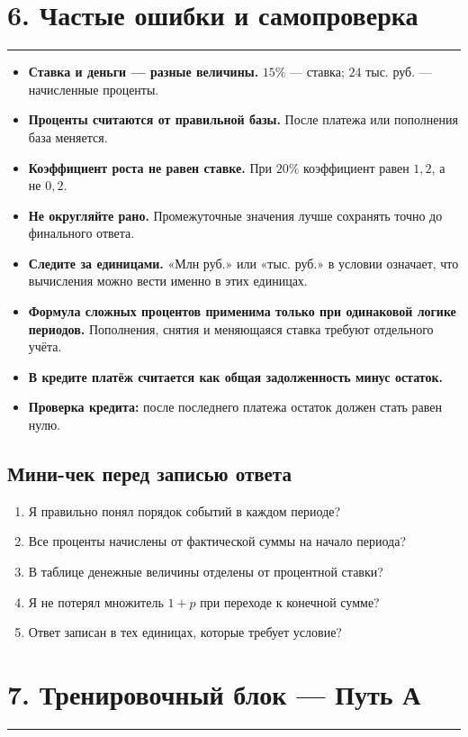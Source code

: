 \documentclass[a4paper,12pt]{article}
\newcommand{\sectionline}{\vspace{-0.4em}\textcolor{linegray}{\rule{\linewidth}{0.5pt}}\vspace{0.35em}}
\newcommand{\key}[1]{\textcolor{darkaccent}{\textbf{#1}}}
\begin{document}
\section*{6. Частые ошибки и самопроверка}
\sectionline

\begin{itemize}
\item \key{Ставка и деньги --- разные величины.} $15\%$ --- ставка; $24$ тыс. руб. --- начисленные проценты.
\item \key{Проценты считаются от правильной базы.} После платежа или пополнения база меняется.
\item \key{Коэффициент роста не равен ставке.} При $20\%$ коэффициент равен $1{,}2$, а не $0{,}2$.
\item \key{Не округляйте рано.} Промежуточные значения лучше сохранять точно до финального ответа.
\item \key{Следите за единицами.} «Млн руб.» или «тыс. руб.» в условии означает, что вычисления можно вести именно в этих единицах.
\item \key{Формула сложных процентов применима только при одинаковой логике периодов.} Пополнения, снятия и меняющаяся ставка требуют отдельного учёта.
\item \key{В кредите платёж считается как общая задолженность минус остаток.}
\item \key{Проверка кредита:} после последнего платежа остаток должен стать равен нулю.
\end{itemize}

\subsection*{Мини-чек перед записью ответа}
\begin{enumerate}
\item Я правильно понял порядок событий в каждом периоде?
\item Все проценты начислены от фактической суммы на начало периода?
\item В таблице денежные величины отделены от процентной ставки?
\item Я не потерял множитель $1+p$ при переходе к конечной сумме?
\item Ответ записан в тех единицах, которые требует условие?
\end{enumerate}

\clearpage

\section*{7. Тренировочный блок --- Путь А}
\sectionline
\end{document}
